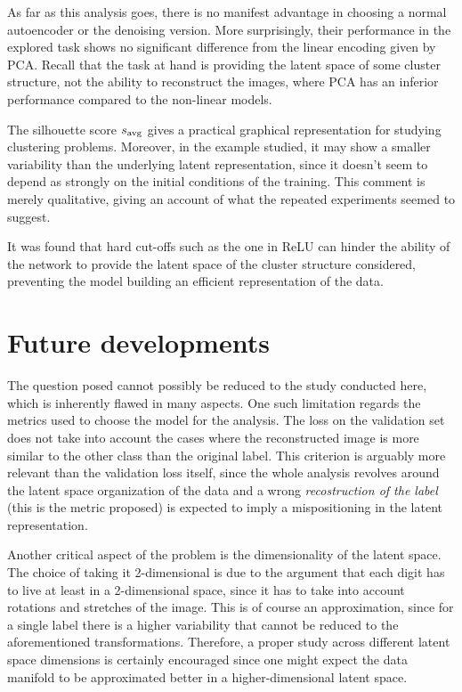 \documentclass[twocolumn,gsifonts,twoside]{gsipaper}
\begin{document}
As far as this analysis goes, there is no manifest advantage in choosing a normal autoencoder or the denoising version. More surprisingly, their performance in the explored task shows no significant difference from the linear encoding given by PCA. Recall that the task at hand is providing the latent space of some cluster structure, not the ability to reconstruct the images, where PCA has an inferior performance compared to the non-linear models.

The silhouette score $s_\textup{avg}$ gives a practical graphical representation for studying clustering problems. Moreover, in the example studied, it may show a smaller variability than the underlying latent representation, since it doesn't seem to depend as strongly on the initial conditions of the training. This comment is merely qualitative, giving an account of what the repeated experiments seemed to suggest.

It was found that hard cut-offs such as the one in ReLU can hinder the ability of the network to provide the latent space of the cluster structure considered, preventing the model building an efficient representation of the data. 


\section{Future developments}
The question posed cannot possibly be reduced to the study conducted here, which is inherently flawed in many aspects. One such limitation regards the metrics used to choose the model for the analysis. The loss on the validation set does not take into account the cases where the reconstructed image is more similar to the other class than the original label. This criterion is arguably more relevant than the validation loss itself, since the whole analysis revolves around the latent space organization of the data and a wrong \emph{recostruction of the label} (this is the metric proposed) is expected to imply a mispositioning in the latent representation.

Another critical aspect of the problem is the dimensionality of the latent space. The choice of taking it 2-dimensional is due to the argument that each digit has to live at least in a 2-dimensional space, since it has to take into account rotations and stretches of the image. This is of course an approximation, since for a single label there is a higher variability that cannot be reduced to the aforementioned transformations. Therefore, a proper study across different latent space dimensions is certainly encouraged since one might expect the data manifold to be approximated better in a higher-dimensional latent space.
\end{document}

